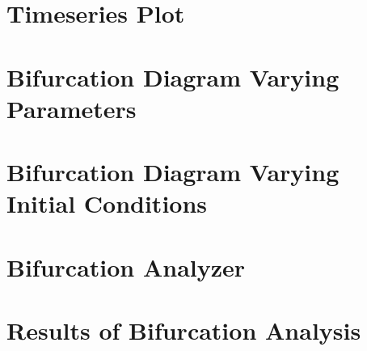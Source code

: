 \section{Timeseries Plot}

\section{Bifurcation Diagram Varying Parameters}

\section{Bifurcation Diagram Varying Initial Conditions}

\section{Bifurcation Analyzer}\label{bifurcation_analyzer}


\section{Results of Bifurcation Analysis}\label{bifurcation_analysis}


